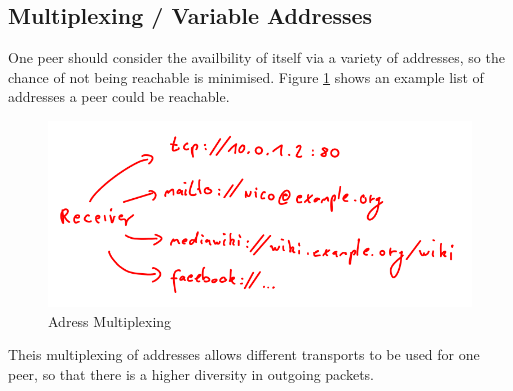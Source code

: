 \subsection{Multiplexing / Variable Addresses}
\label{multiplexing}
One peer should consider the availbility of itself via a variety
of addresses, so the chance of not being reachable is minimised.
Figure \ref{addressmultiplexing} shows an example list of addresses
a peer could be reachable.
\begin{figure}
    \centering
    \caption{Adress Multiplexing}
    \label{addressmultiplexing}
    \includegraphics[scale=0.8]{addressmultiplexing.png}
\end{figure}
Theis multiplexing of addresses allows different transports to be used
for one peer, so that there is a higher diversity in outgoing packets.
